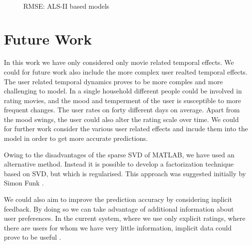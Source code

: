 \begin{figure}[h!]
{\label{fig:Model 1}
}
\\
\label{fig:RMSE SVD}
\caption{RMSE: ALS-II based models}
\end{figure}


\section{Future Work}
In this work we have only considered only movie related temporal effects. We
could for future work also include the more complex user realted temporal
effects. The user related temporal dynamics proves to be more comples and more
challenging to model. In a single household different people could be involved
in rating movies, and the mood and temperment of the user is susceptible to more
frequent changes. The user rates on forty different days on average. Apart from
the mood swings, the user could also alter the rating scale over time. We could
for further work consider the various user related effects and incude them into
the model in order to get more accurate predictions. 

Owing to the disadvantages of the sparse SVD of MATLAB, we have used an
alternative method. Instead it is possible to develop a factorization technique
based on SVD, but which is regularised. This approach was suggested initially by
Simon Funk \cite{Paterek_RegSVD}.

We could also aim to improve the prediction accuracy by considering inplicit
feedback. By doing so we can take advantage of additional information about user
preferences. In the current system, where we use only explicit ratings, where
there are users for whom we have very little information, implicit data could
prove to be useful \cite{citeulike:8923836}.








